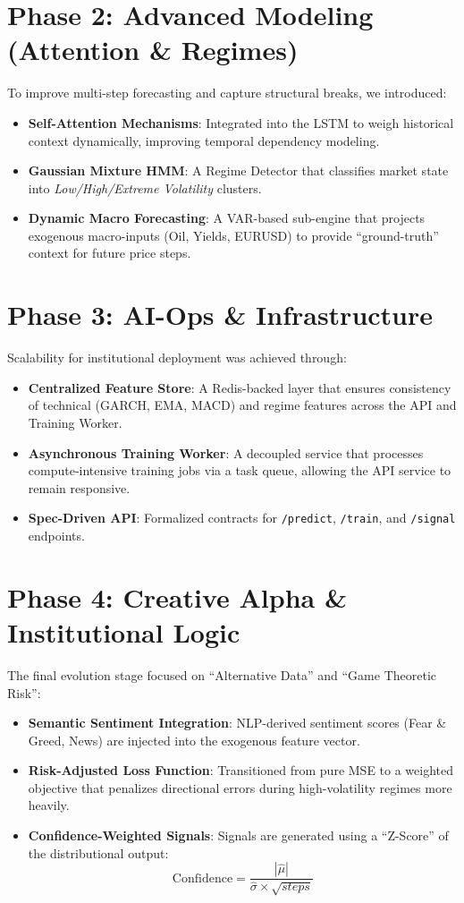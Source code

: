 \documentclass[11pt, a4paper]{article}
\begin{document}
\section{Phase 2: Advanced Modeling (Attention \& Regimes)}
To improve multi-step forecasting and capture structural breaks, we introduced:
\begin{itemize}
    \item \textbf{Self-Attention Mechanisms}: Integrated into the LSTM to weigh historical context dynamically, improving temporal dependency modeling.
    \item \textbf{Gaussian Mixture HMM}: A Regime Detector that classifies market state into \textit{Low/High/Extreme Volatility} clusters.
    \item \textbf{Dynamic Macro Forecasting}: A VAR-based sub-engine that projects exogenous macro-inputs (Oil, Yields, EURUSD) to provide ``ground-truth'' context for future price steps.
\end{itemize}

\section{Phase 3: AI-Ops \& Infrastructure}
Scalability for institutional deployment was achieved through:
\begin{itemize}
    \item \textbf{Centralized Feature Store}: A Redis-backed layer that ensures consistency of technical (GARCH, EMA, MACD) and regime features across the API and Training Worker.
    \item \textbf{Asynchronous Training Worker}: A decoupled service that processes compute-intensive training jobs via a task queue, allowing the API service to remain responsive.
    \item \textbf{Spec-Driven API}: Formalized contracts for \texttt{/predict}, \texttt{/train}, and \texttt{/signal} endpoints.
\end{itemize}

\section{Phase 4: Creative Alpha \& Institutional Logic}
The final evolution stage focused on ``Alternative Data'' and ``Game Theoretic Risk'':
\begin{itemize}
    \item \textbf{Semantic Sentiment Integration}: NLP-derived sentiment scores (Fear \& Greed, News) are injected into the exogenous feature vector.
    \item \textbf{Risk-Adjusted Loss Function}: Transitioned from pure MSE to a weighted objective that penalizes directional errors during high-volatility regimes more heavily.
    \item \textbf{Confidence-Weighted Signals}: Signals are generated using a ``Z-Score'' of the distributional output:
    \begin{equation}
    \text{Confidence} = \frac{|\hat{\mu}|}{\hat{\sigma} \times \sqrt{steps}}
    \end{equation}
\end{itemize}
\end{document}

